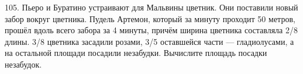 105. Пьеро и Буратино устраивают для Мальвины цветник. Они поставили новый забор вокруг цветника. Пудель Артемон, который за минуту проходит 50 метров, прошёл вдоль всего забора за 4 минуты, причём ширина цветника составляла 2/8 длины. 3/8 цветника засадили розами, 3/5 оставшейся части --- гладиолусами, а на остальной площади посадили незабудки. Вычислите площадь посадки незабудок.\\
